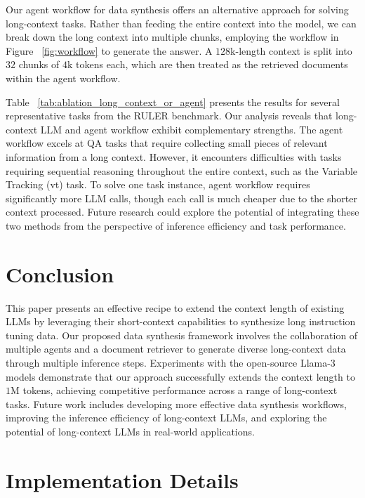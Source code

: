 \documentclass{article}
\begin{document}
Our agent workflow for data synthesis offers an alternative approach for solving long-context tasks.
Rather than feeding the entire context into the model,
we can break down the long context into multiple chunks,
employing the workflow in Figure ~\ref{fig:workflow} to generate the answer.
A $128$k-length context is split into $32$ chunks of $4$k tokens each,
which are then treated as the retrieved documents within the agent workflow.

Table ~\ref{tab:ablation_long_context_or_agent} presents the results for several representative tasks
from the RULER benchmark.
Our analysis reveals that long-context LLM and agent workflow exhibit complementary strengths.
The agent workflow excels at QA tasks that require collecting small pieces of relevant information from a long context.
However,
it encounters difficulties with tasks requiring sequential reasoning throughout the entire context,
such as the Variable Tracking (vt) task.
To solve one task instance,
agent workflow requires significantly more LLM calls,
though each call is much cheaper due to the shorter context processed.
Future research could explore the potential of integrating these two methods
from the perspective of inference efficiency and task performance.

\section{Conclusion}
This paper presents an effective recipe to extend the context length of existing LLMs
by leveraging their short-context capabilities to synthesize long instruction tuning data.
Our proposed data synthesis framework involves the collaboration of
multiple agents and a document retriever to generate diverse long-context data
through multiple inference steps.
Experiments with the open-source Llama-3 models demonstrate that
our approach successfully extends the context length to $1$M tokens,
achieving competitive performance across a range of long-context tasks.
Future work includes developing more effective data synthesis workflows,
improving the inference efficiency of long-context LLMs,
and exploring the potential of long-context LLMs in real-world applications.






\appendix

\section{Implementation Details} \label{sec:app_implementation}
\end{document}
